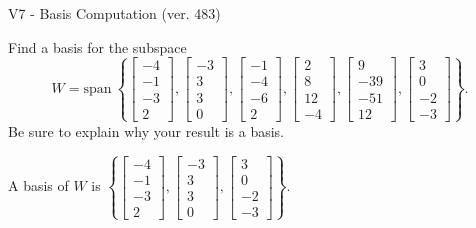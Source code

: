 \begin{exercise}
  \begin{exerciseTitle}V7 - Basis Computation (ver. 483)\end{exerciseTitle}
  \begin{exerciseStatement}
    Find a basis for the subspace 
\[W=\mathrm{span}\ \left\{\left[\begin{array}{r}
-4 \\
-1 \\
-3 \\
2
\end{array}\right] , \left[\begin{array}{r}
-3 \\
3 \\
3 \\
0
\end{array}\right] , \left[\begin{array}{r}
-1 \\
-4 \\
-6 \\
2
\end{array}\right] , \left[\begin{array}{r}
2 \\
8 \\
12 \\
-4
\end{array}\right] , \left[\begin{array}{r}
9 \\
-39 \\
-51 \\
12
\end{array}\right] , \left[\begin{array}{r}
3 \\
0 \\
-2 \\
-3
\end{array}\right]\right\}.\]
 Be sure to explain why your result is a basis.


  \end{exerciseStatement}
  \begin{exerciseAnswer}
   A basis of \(W\) is  \(\left\{\left[\begin{array}{r}
-4 \\
-1 \\
-3 \\
2
\end{array}\right] , \left[\begin{array}{r}
-3 \\
3 \\
3 \\
0
\end{array}\right] , \left[\begin{array}{r}
3 \\
0 \\
-2 \\
-3
\end{array}\right]\right\}\).
  


  \end{exerciseAnswer}
\end{exercise}